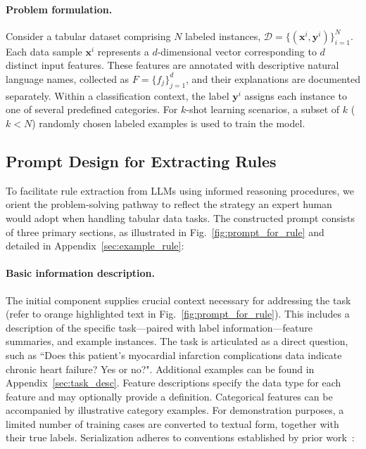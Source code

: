 \vspace*{-0.12in}
\paragraph{Problem formulation.} Consider a tabular dataset comprising $N$ labeled instances, $\mathcal{D} = \{(\mathbf{x}^i, \mathbf{y}^i)\}_{i=1}^{N}$. Each data sample $\mathbf{x}^i$ represents a $d$-dimensional vector corresponding to $d$ distinct input features. These features are annotated with descriptive natural language names, collected as $F = \{f_j\}_{j=1}^{d}$, and their explanations are documented separately. Within a classification context, the label $\mathbf{y}^i$ assigns each instance to one of several predefined categories. For $k$-shot learning scenarios, a subset of $k$ ($k < N$) randomly chosen labeled examples is used to train the model.

\subsection{Prompt Design for Extracting Rules}
\label{Sec:prompt_design}
To facilitate rule extraction from LLMs using informed reasoning procedures, we orient the problem-solving pathway to reflect the strategy an expert human would adopt when handling tabular data tasks. The constructed prompt consists of three primary sections, as illustrated in Fig.~\ref{fig:prompt_for_rule} and detailed in Appendix~\ref{sec:example_rule}:

\vspace*{-0.12in}
\paragraph{Basic information description.} The initial component supplies crucial context necessary for addressing the task (refer to orange highlighted text in Fig.~\ref{fig:prompt_for_rule}). This includes a description of the specific task—paired with label information—feature summaries, and example instances. The task is articulated as a direct question, such as ``Does this patient's myocardial infarction complications data indicate chronic heart failure? Yes or no?". Additional examples can be found in Appendix~\ref{sec:task_desc}. Feature descriptions specify the data type for each feature and may optionally provide a definition. Categorical features can be accompanied by illustrative category examples. For demonstration purposes, a limited number of training cases are converted to textual form, together with their true labels. Serialization adheres to conventions established by prior work~\cite{dinh2022lift,hegselmann2023tabllm}:


